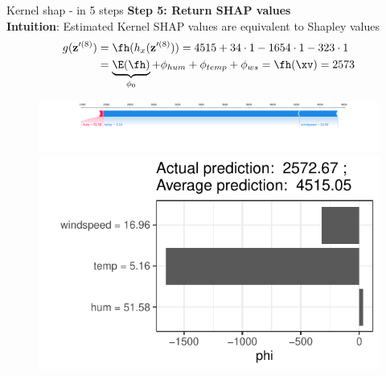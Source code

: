 \documentclass[11pt,compress,t,notes=noshow, aspectratio=169, xcolor=table]{beamer}
\begin{document}
\begin{frame}{Kernel shap - in 5 steps}
\textbf{Step 5: Return SHAP values}\\\medskip
\textbf{Intuition}: Estimated Kernel SHAP values are equivalent to Shapley values 
\begin{align*}
g(\mathbf{z}^{\prime (8)}) &= \fh(h_x(\mathbf{z}^{\prime (8)}) ) = 4515 + 34 \cdot 1 - 1654 \cdot 1 - 323 \cdot 1\\&= \underbrace{\E(\fh)}_{\phi_0} + \phi_{hum} + \phi_{temp} + \phi_{ws} = \fh(\xv) = 2573
\end{align*}

\begin{figure}
    \centering
    \includegraphics[width=\columnwidth]{figure_man/exSHAP.png}
    \includegraphics[trim={10 17 5 5},clip, width=0.4\linewidth]{figure/shapley2shap.pdf}
\end{figure}


\end{frame}

\end{document}
